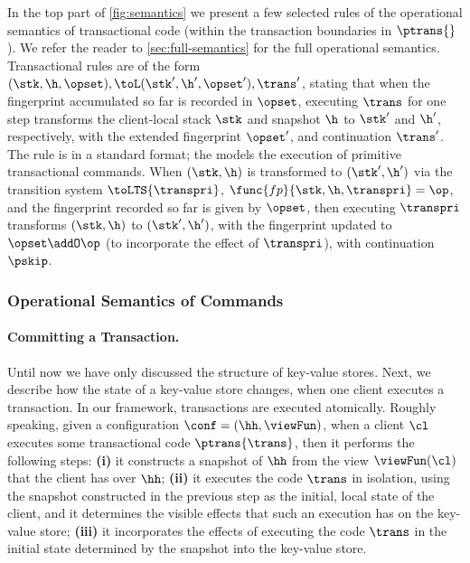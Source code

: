In the top part of \cref{fig:semantics} we present a few selected rules of the operational semantics of transactional code (within the transaction boundaries in $\ptrans{}$). 
We refer the reader to \cref{sec:full-semantics} for the full operational semantics.
Transactional rules are of the form $(\stk, \h, \opset), \toL (\stk', \h', \opset'), \trans'$, 
stating that when the fingerprint accumulated so far is recorded in $\opset$, 
executing $\trans$ for one step transforms the client-local stack $\stk$ 
and snapshot $\h$ to $\stk'$ and $\h'$, respectively, with the extended fingerprint $\opset'$, and continuation $\trans'$.
The  rule is in a standard format; 
the   models the execution of primitive transactional commands.
When $(\stk, \h)$ is transformed to $(\stk', \h')$ via the transition system $\toLTS{\transpri}$,
$\func{fp}{\stk, \h, \transpri} = \op$, and the fingerprint recorded so far is given by $\opset$, 
then executing $\transpri$ transforms $(\stk, \h)$ to $(\stk', \h')$, with the fingerprint updated to $\opset \addO \op$ (to incorporate the effect of $\transpri$), with continuation $\pskip$. 

\subsubsection{Operational Semantics of Commands}


\paragraph{Committing a Transaction.}
Until now we have only discussed the structure of key-value stores. 
Next, we describe how the state of a key-value store changes, when 
one client executes a transaction. 
In our framework, transactions are executed atomically. 
Roughly speaking, given a configuration $\conf = (\hh, \viewFun)$, 
when a client $\cl$ executes some transactional code $\ptrans{\trans}$, 
then it performs the following steps: 
\textbf{(i)} it constructs a snapshot of $\hh$ from the view $\viewFun(\cl)$ that 
the client has over $\hh$; \textbf{(ii)} it executes the code $\trans$ in isolation, using the 
snapshot constructed in the previous step as the initial, local state of the client, and it determines the visible 
effects that such an execution has on the key-value store; \textbf{(iii)} it incorporates 
the effects of executing the code $\trans$ in the initial state determined by the snapshot into 
the key-value store.

